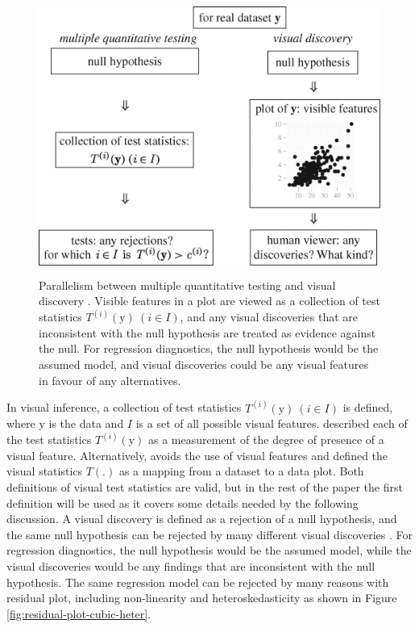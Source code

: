 \documentclass[]{interact}
\theoremstyle{plain}%
\theoremstyle{definition}
\theoremstyle{remark}
\begin{document}
\begin{figure}
\centering
\includegraphics[width=4.6875in,height=3.55208in]{figures/rsta2009012001.jpg}
\caption{Parallelism between multiple quantitative testing and visual
discovery \citep{buja_statistical_2009}. Visible features in a plot are
viewed as a collection of test statistics
\(T^{(i)}(\boldsymbol{\mathrm{y}})~(i \in I)\), and any visual
discoveries that are inconsistent with the null hypothesis are treated
as evidence against the null. For regression diagnostics, the null
hypothesis would be the assumed model, and visual discoveries could be
any visual features in favour of any alternatives.
\label{fig:parallelism}}
\end{figure}

In visual inference, a collection of test statistics
\(T^{(i)}(\boldsymbol{\mathrm{y}})~(i \in I)\) is defined, where
\(\boldsymbol{\mathrm{y}}\) is the data and \(I\) is a set of all
possible visual features. \citet{buja_statistical_2009} described each
of the test statistics \(T^{(i)}(\boldsymbol{\mathrm{y}})\) as a
measurement of the degree of presence of a visual feature.
Alternatively, \citet{majumder_validation_2013} avoids the use of visual
features and defined the visual statistics \(T(.)\) as a mapping from a
dataset to a data plot. Both definitions of visual test statistics are
valid, but in the rest of the paper the first definition will be used as
it covers some details needed by the following discussion. A visual
discovery is defined as a rejection of a null hypothesis, and the same
null hypothesis can be rejected by many different visual discoveries
\citep{buja_statistical_2009}. For regression diagnostics, the null
hypothesis would be the assumed model, while the visual discoveries
would be any findings that are inconsistent with the null hypothesis.
The same regression model can be rejected by many reasons with residual
plot, including non-linearity and heteroskedasticity as shown in Figure
\ref{fig:residual-plot-cubic-heter}.
\end{document}
